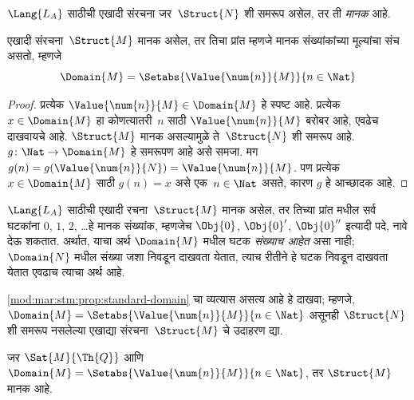 \begin{defn}
$\Lang{L_A}$ साठीची एखादी संरचना जर~$\Struct{N}$ शी समरूप असेल,
तर ती \emph{मानक} आहे.
\end{defn}

\begin{prop}
\label{mod:mar:stm:prop:standard-domain} एखादी संरचना~$\Struct{M}$ मानक असेल,
तर तिचा प्रांत म्हणजे मानक संख्यांकांच्या मूल्यांचा संच असतो, म्हणजे
\[\Domain{M} = \Setabs{\Value{\num{n}}{M}}{n \in \Nat}
\]
\end{prop}

\begin{proof}
प्रत्येक $\Value{\num{n}}{M} \in \Domain{M}$ हे स्पष्ट आहे. प्रत्येक
$x \in \Domain{M}$ हा कोणत्यातरी~$n$ साठी $\Value{\num{n}}{M}$ बरोबर आहे,
एवढेच दाखवायचे आहे. $\Struct{M}$ मानक असल्यामुळे ते~$\Struct{N}$ शी समरूप
आहे. $g\colon \Nat \to \Domain{M}$ हे समरूपण आहे असे समजा. मग
$g(n) = g(\Value{\num{n}}{N}) = \Value{\num{n}}{M}$. पण प्रत्येक
$x \in \Domain{M}$ साठी $g(n) = x$ असे एक~$n \in \Nat$ असते, कारण
$g$ हे आच्छादक आहे.
\end{proof}

\begin{explain}
$\Lang{L_A}$ साठीची एखादी रचना~$\Struct{M}$ मानक असेल, तर तिच्या
प्रांत मधील सर्व घटकांना $\num{0}$, $\num{1}$, $\num{2}$, \dots हे
मानक संख्यांक, म्हणजेच $\Obj{0}$, $\Obj{0}'$, $\Obj{0}''$ इत्यादी पदे,
नावे देऊ शकतात. अर्थात, याचा अर्थ $\Domain{M}$ मधील घटक
\emph{संख्याच आहेत} असा नाही; $\Domain{N}$ मधील संख्या जशा निवडून दाखवता
येतात, त्याच रीतीने हे घटक निवडून दाखवता येतात एवढाच त्याचा अर्थ आहे.
\end{explain}

\begin{prob}
\ref{mod:mar:stm:prop:standard-domain} चा व्यत्यास असत्य आहे हे दाखवा;
म्हणजे, $\Domain{M} = \Setabs{\Value{\num{n}}{M}}{n \in \Nat}$ असूनही
$\Struct{N}$ शी समरूप नसलेल्या एखाद्या संरचना~$\Struct{M}$ चे
उदाहरण द्या.
\end{prob}

\begin{prop}
\label{mod:mar:stm:prop:thq-standard}
जर $\Sat{M}{\Th{Q}}$ आणि $\Domain{M} =
\Setabs{\Value{\num{n}}{M}}{n \in \Nat}$, तर $\Struct{M}$ मानक आहे.
\end{prop}

